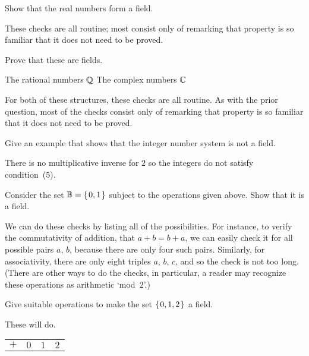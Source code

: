 \begin{exercises}
  \item 
    Show that the real numbers form a field.
    \begin{answer}
      These checks are all routine; most consist only of remarking that 
      property is so familiar that it does not need to be proved.
    \end{answer}
  \item 
    Prove that these are fields.
    \begin{exparts*}
       \partsitem The rational numbers $\mathbb{Q}$
       \partsitem The complex numbers  $\mathbb{C}$
    \end{exparts*}
    \begin{answer}
      For both of these structures, these checks are all routine.
      As with the prior question, most of the checks consist only of remarking
      that property is so familiar that it does not need to be proved.
    \end{answer}
  \item 
     Give an example that shows that the integer number system
     is not a field.
     \begin{answer}
       There is no multiplicative inverse for $2$ so the integers do not
       satisfy condition~(5).
     \end{answer}
  \item \label{exer:BinField} 
     Consider the set $\mathbb{B}=\mbox{$\{\hspace{0.1em}0,1\hspace{0.1em}\}$}$ subject to the operations 
     given above.
     Show that it is a field.
     \begin{answer}
       We can do these checks by listing all of the possibilities.
       For instance, to verify the commutativity of addition, that $a+b=b+a$,
       we can easily check it for all possible pairs $a$, $b$, because there
       are only four such pairs.  
       Similarly, for associativity, there are only eight triples $a$, $b$,
       $c$, and so the check is not too long.
       (There are other ways to do the checks, in particular, a reader may 
       recognize these operations as arithmetic `mod~$2$'.)
     \end{answer}
  \item 
     Give suitable operations to make the set $\mbox{$\{\hspace{0.1em}0,1,2\hspace{0.1em}\}$}$
     a field.     
     \begin{answer}
       These will do.
       \begin{center}
          \begin{tabular}{c|ccc}
             \( + \) &\( 0 \) &\( 1 \) &$2$ \\

\end{tabular}
\end{center}
\end{answer}
\end{exercises}
